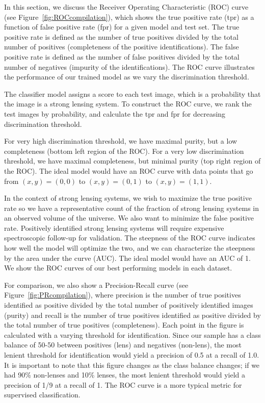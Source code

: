 \documentclass{emulateapj}
\begin{document}
In this section, we discuss the Receiver Operating Characteristic
(ROC) curve (see Figure~\ref{fig:ROCcompilation}), which shows the
true positive rate (tpr) as a function of false positive rate (fpr)
for a given model and test set.  The true positive rate is defined as
the number of true positives divided by the total number of positives
(completeness of the positive identifications).  The false positive
rate is defined as the number of false positives divided by the total
number of negatives (impurity of the identifications).  The ROC curve
illustrates the performance of our trained model as we vary the
discrimination threshold.

The classifier model assigns a score to each test image, which is a
probability that the image is a strong lensing system.  To construct
the ROC curve, we rank the test images by probability, and calculate
the tpr and fpr for decreasing discrimination threshold.

For very high discrimination threshold, we have maximal purity, but a
low completeness (bottom left region of the ROC).  For a very low
discrimination threshold, we have maximal completeness, but minimal
purity (top right region of the ROC).  The ideal model would have an
ROC curve with data points that go from $(x, y) = (0, 0)$ to $(x, y) =
(0, 1)$ to $(x, y) = (1, 1)$.

In the context of strong lensing systems, we wish to maximize the true
positive rate so we have a representative count of the fraction of
strong lensing systems in an observed volume of the universe.  We also
want to minimize the false positive rate.  Positively identified
strong lensing systems will require expensive spectroscopic follow-up
for validation.  The steepness of the ROC curve indicates how well the
model will optimize the two, and we can characterize the steepness by
the area under the curve (AUC).  The ideal model would have an AUC of
1.  We show the ROC curves of our best performing models in each
dataset.

For comparison, we also show a Precision-Recall curve (see
Figure~\ref{fig:PRcompilation}), where precision is the number of true
positives identified as positive divided by the total number of
positively identified images (purity) and recall is the number of true
positives identified as positive divided by the total number of true
positives (completeness).  Each point in the figure is calculated with
a varying threshold for identification.  Since our sample has a class
balance of 50-50 between positives (lens) and negatives (non-lens),
the most lenient threshold for identification would yield a precision
of 0.5 at a recall of 1.0.  It is important to note that this figure
changes as the class balance changes; if we had 90\% non-lenses and
10\% lenses, the most lenient threshold would yield a precision of 1/9
at a recall of 1.  The ROC curve is a more typical metric for
supervised classification.
\end{document}
